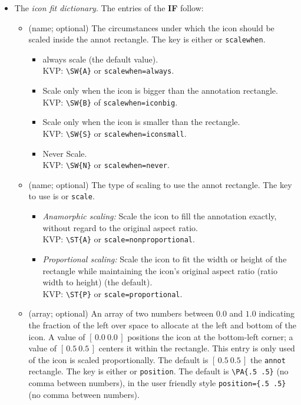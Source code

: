 \documentclass{article}
\begin{document}
\begin{itemize}
  \item [\textbf{IF}] The \emph{icon fit dictionary}. The entries of the \textbf{IF} follow:
  \begin{itemize}
    \item [\textbf{SW}] (name; optional) The circumstances under which the icon should be scaled inside
    the annot rectangle. The key is either  or \texttt{scalewhen}.
    \begin{itemize}
      \item [\textbf{A}] always scale (the default value).\\KVP: \verb!\SW{A}! or \texttt{scalewhen=always}.
      \item [\textbf{B}] Scale only when the icon is bigger than the annotation rectangle.\\KVP: \verb!\SW{B}!
      of \texttt{scalewhen=iconbig}.
      \item [\textbf{S}] Scale only when the icon is smaller than the rectangle.\\KVP: \verb!\SW{S}!
      or \texttt{scalewhen=iconsmall}.
      \item [\textbf{N}] Never Scale.\\KVP: \verb!\SW{N}! or \texttt{\texttt{scalewhen=never}}.
    \end{itemize}
    \item [\textbf{S}] (name; optional) The type of scaling to use
    the annot rectangle. The key to use is  or \texttt{scale}.
    \begin{itemize}
        \item [\textbf{A}] \emph{Anamorphic scaling:} Scale the icon to fill the annotation exactly, without
              regard to the original aspect ratio.\\KVP: \verb!\ST{A}! or \texttt{scale=nonproportional}.
        \item [\textbf{P}] \emph{Proportional scaling:} Scale the icon to fit the width or height
        of the rectangle while maintaining the icon's original aspect ratio (ratio width to height)
        (the default).\\KVP: \verb!\ST{P}! or \texttt{scale=proportional}.
    \end{itemize}

    \item [\textbf{A}] (array; optional) An array of two numbers between $0.0$ and $1.0$ indicating the fraction of the left
    over space to allocate at the left and bottom of the icon. A value of $[\,0.0\ 0.0\,]$ positions the icon
    at the bottom-left corner; a value of $[\,0.5\ 0.5\,]$ centers it within the rectangle. This entry is only used
    of the icon is scaled proportionally. The default is $[\,0.5\ 0.5\,]$
    the \texttt{annot} rectangle. The key is either  or \texttt{position}.
    The default is \verb!\PA{.5 .5}! (no comma between numbers), in the user friendly style
    \verb!position={.5 .5}! (no comma between numbers).


\end{itemize}
\end{itemize}
\end{document}
